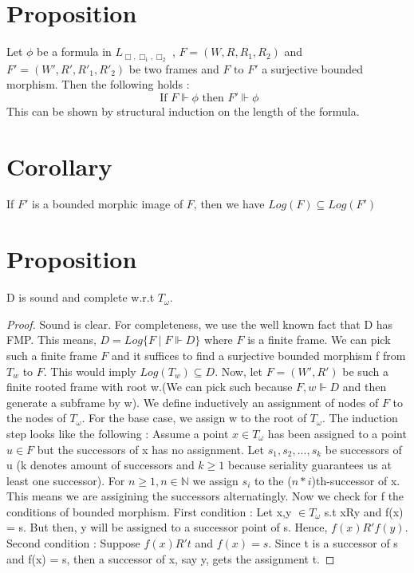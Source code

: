 \documentclass[12pt, a4paper]{scrreprt}
\begin{document}
\section {Proposition}
Let $\phi$ be a formula in $L_{\Box, \Box_1, \Box_2}$ , $F = (W, R, R_1, R_2)$ and $F' = (W', R', R'_1, R'_2)$ be two frames and $F \mbox{ to } F'$ a surjective bounded morphism. Then the following holds :
$$ \mbox{ If }F \Vdash \phi \mbox{ then } F' \Vdash \phi$$
This can be shown by structural induction on the length of the formula.

\section{Corollary}
If $F'$ is a bounded morphic image of $F$, then we have $Log(F) \subseteq Log(F')$

\section{Proposition}
D is sound and complete w.r.t $T_\omega$.

\begin{proof}
Sound is clear. For completeness, we use the well known fact that D has FMP. This means, $D = Log\{F \mid F \Vdash D\}$ where $F$ is a finite frame.
We can pick such a finite frame $F$ and it suffices to find a surjective bounded morphism f from $T_w$ to $F$. This would imply $Log(T_w) \subseteq D$. \newline
Now, let $F = (W', R')$ be such a finite rooted frame with root w.(We can pick such because $F,w \Vdash D$ and then generate a subframe by w). We define 
inductively an assignment of nodes of $F$ to the nodes of $T_\omega$. For the base case, we assign w to the root of $T_\omega$. The induction step looks like the following : 
Assume a point $x \in T_\omega$ has been assigned to a point $u \in F$ but the successors of x has no assignment. 
Let $s_1, s_2, ..., s_k$ be successors of u (k denotes amount of successors and $k\geq 1$ because seriality guarantees us at least one successor).
For $n \geq 1, n \in \mathbb{N}$ we assign $s_i$ to the ($n * i$)th-successor of x. This means we are assigining the successors alternatingly. \newline
Now we check for f the conditions of bounded morphism. First condition : Let x,y $\in T_\omega$ s.t xRy and f(x) = s. But then, y will be assigned to a successor point of s. 
Hence, $f(x) R'f(y)$. Second condition : Suppose $f(x)R't$ and $f(x) = s$. Since t is a successor of s and f(x) = s, then a successor of x, say y, gets the assignment t. 

\end{proof}
\end{document}
